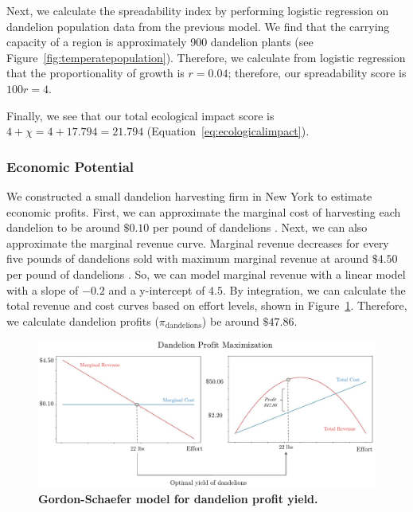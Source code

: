 Next, we calculate the spreadability index by performing logistic regression on dandelion population data from the previous model. We find that the carrying capacity of a region is approximately 900 dandelion plants (see Figure~\ref{fig:temperatepopulation}). Therefore, we calculate from logistic regression that the proportionality of growth is \(r = 0.04\); therefore, our spreadability score is \(100r = 4\).

Finally, we see that our total ecological impact score is \(4 + \chi = 4 + 17.794 = 21.794\) (Equation~\ref{eq:ecologicalimpact}).

\subsubsection{Economic Potential}

We constructed a small dandelion harvesting firm in New York to estimate economic profits. First, we can approximate the marginal cost of harvesting each dandelion to be around \(\$0.10\) per pound of dandelions \cite{farmshowGrowingDandelions, gardeningknowhowDandelionHarvest}. Next, we can also approximate the marginal revenue curve. Marginal revenue decreases for every five pounds of dandelions sold with maximum marginal revenue at around \(\$4.50\) per pound of dandelions \cite{farmfitlivingMakeMoney}.
So, we can model marginal revenue with a linear model with a slope of $-0.2$ and a y-intercept of $4.5$. By integration, we can calculate the total revenue and cost curves based on effort levels, shown in Figure~\ref{fig:dandelionprofits}. Therefore, we calculate dandelion profits (\(\pi_{\text{dandelions}}\)) be around \(\$47.86\).

\begin{figure}[h!]
\centering
    \includegraphics[scale=0.5]{figures/dandelionprofitmax.pdf}
    \captionsetup{width=0.9\textwidth}
    \caption{\textbf{Gordon-Schaefer model for dandelion profit yield.}}
    \label{fig:dandelionprofits}
\end{figure}

